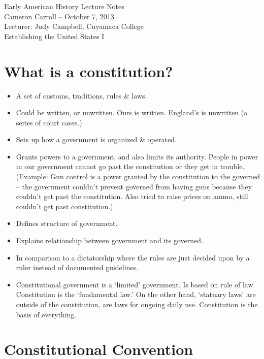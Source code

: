 \documentclass{article}
\begin{document}
  \begin{center}
    {\small{} Early American History Lecture Notes} \\[0.6cm]
    {\small{} Cameron Carroll -- October 7, 2013} \\[0.6cm]
    {\small{} Lecturer: Judy Campbell, Cuyamaca College}\\[1cm]
    {\small{} Establishing the United States I}\\[1cm]
  \end{center}
  
  \tableofcontents
  \newpage
  

  \section{What is a constitution?}
    \begin{itemize}
      \item  A set of customs, traditions, rules \& laws. 
      \item Could be written, or unwritten. Ours is written. England's is unwritten (a series of court cases.)
      \item Sets up how a government is organized \& operated.
      \item Grants powers to a government, and also limits its authority. People in power in our government cannot go past the constitution or they get in trouble. (Example: Gun control is a power granted by the constitution to the governed -- the government couldn't prevent governed from having guns because they couldn't get past the constitution. Also tried to raise prices on ammo, still couldn't get past constitution.)
      \item Defines structure of government. 
      \item Explains relationship between government and its governed.
      \item In comparison to a dictatorship where the rules are just decided upon by a ruler instead of documented guidelines.
      \item Constitutional government is a `limited' government. Is based on rule of law. Constitution is the `fundamental law.' On the other hand, `statuary laws' are outside of the constitution, are laws for ongoing daily use. Constitution is the basis of everything.
    \end{itemize}

  \section{Constitutional Convention}
\end{document}
